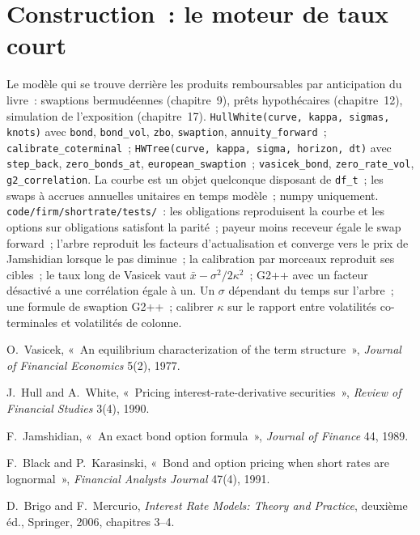 \section{Construction~: le moteur de taux court}\label{bld:rc:short-rate-models:shortrate}

\begin{build}
 Le modèle qui se trouve derrière les produits remboursables par anticipation du livre~: swaptions bermudéennes
(chapitre~9), prêts hypothécaires (chapitre~12), simulation de l'exposition (chapitre~17).
 \texttt{HullWhite(curve, kappa, sigmas, knots)} avec
\texttt{bond}, \texttt{bond\_vol}, \texttt{zbo}, \texttt{swaption},
\texttt{annuity\_forward}~; \texttt{calibrate\_coterminal}~; \texttt{HWTree(curve,
kappa, sigma, horizon, dt)} avec \texttt{step\_back}, \texttt{zero\_bonds\_at},
\texttt{european\_swaption}~; \texttt{vasicek\_bond}, \texttt{zero\_rate\_vol},
\texttt{g2\_correlation}.
 La courbe est un objet quelconque disposant de \texttt{df\_t}~; les swaps à
accrues annuelles unitaires en temps modèle~; numpy uniquement.
 \texttt{code/firm/shortrate/tests/}~: les obligations reproduisent la
courbe et les options sur obligations satisfont la parité~; payeur moins receveur égale
le swap forward~; l'arbre reproduit les facteurs d'actualisation et converge vers le prix de
Jamshidian lorsque le pas diminue~; la calibration par morceaux reproduit ses cibles~; le taux long de Vasicek
vaut $\bar x-\sigma^2/2\kappa^2$~; G2++ avec un facteur désactivé a une
corrélation égale à un.
 Un $\sigma$ dépendant du temps sur l'arbre~; une formule de
swaption G2++~; calibrer $\kappa$ sur le rapport entre volatilités co-terminales et volatilités de colonne.
\end{build}

\begin{omsources}
\item O.\ Vasicek, «~An equilibrium characterization of the term structure~»,
\emph{Journal of Financial Economics} 5(2), 1977.
\item J.\ Hull and A.\ White, «~Pricing interest-rate-derivative securities~»,
\emph{Review of Financial Studies} 3(4), 1990.
\item F.\ Jamshidian, «~An exact bond option formula~», \emph{Journal of Finance}
44, 1989.
\item F.\ Black and P.\ Karasinski, «~Bond and option pricing when short rates are
lognormal~», \emph{Financial Analysts Journal} 47(4), 1991.
\item D.\ Brigo and F.\ Mercurio, \emph{Interest Rate Models: Theory and Practice},
deuxième éd., Springer, 2006, chapitres 3--4.
\end{omsources}

